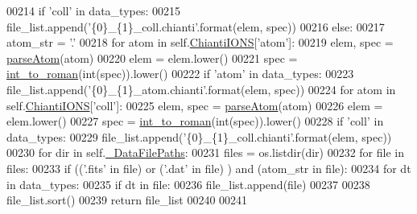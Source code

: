 \begin{DoxyCode}
00214                 \textcolor{keywordflow}{if} \textcolor{stringliteral}{'coll'} \textcolor{keywordflow}{in} data\_types:
00215                     file\_list.append(\textcolor{stringliteral}{'\{0\}\_\{1\}\_coll.chianti'}.format(elem, spec))
00216         \textcolor{keywordflow}{else}:
00217             atom\_str = \textcolor{stringliteral}{'.'}
00218             \textcolor{keywordflow}{for} atom \textcolor{keywordflow}{in} self.\hyperlink{classpyneb_1_1utils_1_1manage__atomic__data_1_1___manage_atomic_data_a06491f5f808df3d4e58b35e09db74a18}{ChiantiIONS}[\textcolor{stringliteral}{'atom'}]:
00219                 elem, spec = \hyperlink{namespacepyneb_1_1utils_1_1misc_a8c069186002a3e73dd474958e35034d5}{parseAtom}(atom)
00220                 elem = elem.lower()
00221                 spec = \hyperlink{namespacepyneb_1_1utils_1_1misc_aec4e973d4cb9299f749ef190ea636a06}{int\_to\_roman}(int(spec)).lower()
00222                 \textcolor{keywordflow}{if} \textcolor{stringliteral}{'atom'} \textcolor{keywordflow}{in} data\_types:
00223                     file\_list.append(\textcolor{stringliteral}{'\{0\}\_\{1\}\_atom.chianti'}.format(elem, spec))
00224             \textcolor{keywordflow}{for} atom \textcolor{keywordflow}{in} self.\hyperlink{classpyneb_1_1utils_1_1manage__atomic__data_1_1___manage_atomic_data_a06491f5f808df3d4e58b35e09db74a18}{ChiantiIONS}[\textcolor{stringliteral}{'coll'}]:
00225                 elem, spec = \hyperlink{namespacepyneb_1_1utils_1_1misc_a8c069186002a3e73dd474958e35034d5}{parseAtom}(atom)
00226                 elem = elem.lower()
00227                 spec = \hyperlink{namespacepyneb_1_1utils_1_1misc_aec4e973d4cb9299f749ef190ea636a06}{int\_to\_roman}(int(spec)).lower()
00228                 \textcolor{keywordflow}{if} \textcolor{stringliteral}{'coll'} \textcolor{keywordflow}{in} data\_types:
00229                     file\_list.append(\textcolor{stringliteral}{'\{0\}\_\{1\}\_coll.chianti'}.format(elem, spec))
00230         \textcolor{keywordflow}{for} dir \textcolor{keywordflow}{in} self.\hyperlink{classpyneb_1_1utils_1_1manage__atomic__data_1_1___manage_atomic_data_a92da10ed6b2395c54f88300c05a71ae9}{\_DataFilePaths}:
00231             files = os.listdir(dir)
00232             \textcolor{keywordflow}{for} file \textcolor{keywordflow}{in} files:
00233                 \textcolor{keywordflow}{if} ((\textcolor{stringliteral}{'.fits'} \textcolor{keywordflow}{in} file) \textcolor{keywordflow}{or} (\textcolor{stringliteral}{'.dat'} \textcolor{keywordflow}{in} file) ) \textcolor{keywordflow}{and} (atom\_str \textcolor{keywordflow}{in} file):
00234                     \textcolor{keywordflow}{for} dt \textcolor{keywordflow}{in} data\_types:
00235                         \textcolor{keywordflow}{if} dt \textcolor{keywordflow}{in} file:
00236                             file\_list.append(file)
00237                             
00238         file\_list.sort()
00239         \textcolor{keywordflow}{return} file\_list
00240     
00241     
\end{DoxyCode}
